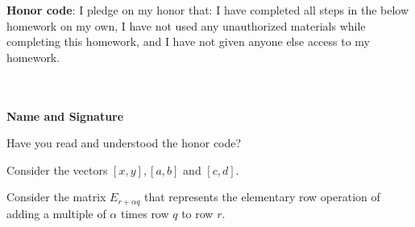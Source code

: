 \documentclass[solution,addpoints,12pt]{exam}
\begin{document}
\noindent \textbf{Honor code}: I pledge on my honor that: I have completed all steps in the below homework on my own, I have not used any unauthorized materials while completing this homework, and I have not given anyone else access to my homework.
\\~\\~\\
\begin{flushright}
\textbf{Name and Signature}

\end{flushright}


\begin{questions}

\question[1] Have you read and understood the honor code?
\begin{solution}

\end{solution}

\question[2] Consider the vectors $[x, y], [a,b]$ and $[c, d]$. 



\question[1] Consider the matrix $E_{r+\alpha q}$ that represents the elementary row operation of adding a multiple of $\alpha$ times row $q$ to row $r$.

\begin{parts}

\end{parts}
\end{questions}
\end{document}

